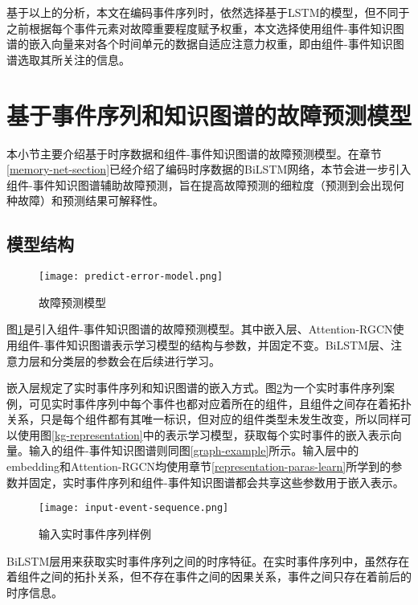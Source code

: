 基于以上的分析，本文在编码事件序列时，依然选择基于LSTM的模型，但不同于之前根据每个事件元素对故障重要程度赋予权重\cite{gao2020task}，本文选择使用组件-事件知识图谱的嵌入向量来对各个时间单元的数据自适应注意力权重，即由组件-事件知识图谱选取其所关注的信息。

\section{基于事件序列和知识图谱的故障预测模型}\label{kg-pre-error}
本小节主要介绍基于时序数据和组件-事件知识图谱的故障预测模型。在章节\ref{memory-net-section}已经介绍了编码时序数据的BiLSTM网络，本节会进一步引入组件-事件知识图谱辅助故障预测，旨在提高故障预测的细粒度（预测到会出现何种故障）和预测结果可解释性。
\subsection{模型结构}
\begin{figure}[htbp]
    \centering
    \texttt{[image: predict-error-model.png]}
    \caption{故障预测模型\label{predict-error-model}}
\end{figure}
图\ref{predict-error-model}是引入组件-事件知识图谱的故障预测模型。其中嵌入层、Attention-RGCN使用组件-事件知识图谱表示学习模型的结构与参数，并固定不变。BiLSTM层、注意力层和分类层的参数会在后续进行学习。

嵌入层规定了实时事件序列和知识图谱的嵌入方式。图\ref{input-event-sequence}为一个实时事件序列案例，可见实时事件序列中每个事件也都对应着所在的组件，且组件之间存在着拓扑关系，只是每个组件都有其唯一标识，但对应的组件类型未发生改变，所以同样可以使用图\ref{kg-representation}中的表示学习模型，获取每个实时事件的嵌入表示向量。输入的组件-事件知识图谱则同图\ref{graph-example}所示。输入层中的embedding和Attention-RGCN均使用章节\ref{representation-paras-learn}所学到的参数并固定，实时事件序列和组件-事件知识图谱都会共享这些参数用于嵌入表示。
\begin{figure}[htbp]
    \centering
    \texttt{[image: input-event-sequence.png]}
    \caption{输入实时事件序列样例\label{input-event-sequence}}
\end{figure}

BiLSTM层用来获取实时事件序列之间的时序特征。在实时事件序列中，虽然存在着组件之间的拓扑关系，但不存在事件之间的因果关系，事件之间只存在着前后的时序信息。

